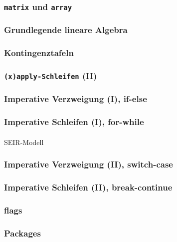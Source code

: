 \documentclass[paper=A4, pagesize, DIV=calc, smallheadings,
fontsize=12pt, expansion=false]{scrreprt}
\begin{document}
\subsubsection*{\texttt{matrix} und \texttt{array}}

\subsubsection*{Grundlegende lineare Algebra}

\subsubsection*{Kontingenztafeln}

\subsubsection*{\texttt{(x)apply-Schleifen} (II)}

\subsubsection*{Imperative Verzweigung (I), if-else}

\subsubsection*{Imperative Schleifen (I), for-while}

\paragraph{}
SEIR-Modell

\subsubsection*{Imperative Verzweigung (II), switch-case}

\subsubsection*{Imperative Schleifen (II), break-continue}

\subsubsection*{flags}

\subsubsection*{Packages}
\end{document}
